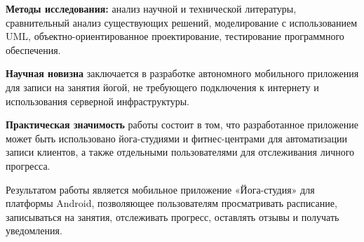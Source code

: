 \textbf{Методы исследования:} анализ научной и технической литературы, сравнительный анализ существующих решений, моделирование с использованием UML, объектно-ориентированное проектирование, тестирование программного обеспечения.

\textbf{Научная новизна} заключается в разработке автономного мобильного приложения для записи на занятия йогой, не требующего подключения к интернету и использования серверной инфраструктуры.

\textbf{Практическая значимость} работы состоит в том, что разработанное приложение может быть использовано йога-студиями и фитнес-центрами для автоматизации записи клиентов, а также отдельными пользователями для отслеживания личного прогресса.

Результатом работы является мобильное приложение «Йога-студия» для платформы Android, позволяющее пользователям просматривать расписание, записываться на занятия, отслеживать прогресс, оставлять отзывы и получать уведомления.